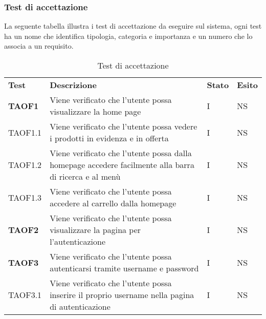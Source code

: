 \subsubsection{Test di accettazione}
La seguente tabella illustra i test di accettazione da eseguire sul sistema, ogni test ha un nome che identifica tipologia, categoria e importanza e un numero che lo associa a un requisito.
\begin{center}
    \centering
    \renewcommand{\arraystretch}{1.8}
    \label{tab:TestAccettazione}
    \begin{longtable}[!h]{p{60px} p{240px} p{35px} p{35px}}
        \caption{Test di accettazione}                                                                                                                                           \\
        \rowcolor{logo!70}
        \textbf{Test}   & \textbf{Descrizione}                                                                                                 & \textbf{Stato} & \textbf{Esito} \\
        \textbf{TAOF1}  & Viene verificato che l'utente possa visualizzare la home page                                                        & I             & NS              \\
        TAOF1.1         & Viene verificato che l'utente possa vedere i prodotti in evidenza e in offerta                                       & I             & NS              \\
        TAOF1.2         & Viene verificato che l'utente possa dalla homepage accedere facilmente alla barra di ricerca e al menù               & I             & NS              \\
        TAOF1.3         & Viene verificato che l'utente possa accedere al carrello dalla homepage                                              & I             & NS              \\
        \textbf{TAOF2}  & Viene verificato che l'utente possa visualizzare la pagina per l'autenticazione                                      & I             & NS              \\
        \textbf{TAOF3}  & Viene verificato che l'utente possa autenticarsi tramite username e password                                         & I             & NS              \\
        TAOF3.1         & Viene verificato che l'utente possa inserire il proprio username nella pagina di autenticazione                      & I             & NS              \\

\end{longtable}
\end{center}
